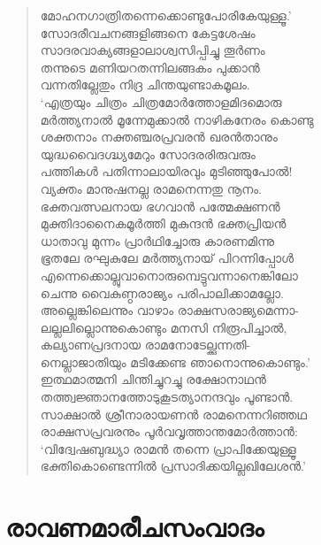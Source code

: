 \begin{verse}
മോഹനഗാത്രിതന്നെക്കൊണ്ടുപോരികേയുള്ളൂ.’\\
സോദരീവചനങ്ങളിങ്ങനെ കേട്ടശേഷം\\
സാദരവാക്യങ്ങളാലാശ്വസിപ്പിച്ചു തൂര്‍ണം\\
തന്നുടെ മണിയറതന്നിലങ്ങകം പുക്കാന്‍\\
വന്നതില്ലേതും നിദ്ര ചിന്തയുണ്ടാകമൂലം.\\
‘എത്രയും ചിത്രം ചിത്രമോര്‍ത്തോളമിദമൊരു\\
മര്‍ത്ത്യനാല്‍ മൂന്നേമുക്കാല്‍ നാഴികനേരം കൊണ്ടു\\
ശക്തനാം നക്തഞ്ചരപ്രവരന്‍ ഖരന്‍താനും\\
യുദ്ധവൈദഗ്ദ്ധ്യമേറും സോദരരിരുവരും\\
പത്തികള്‍ പതിന്നാലായിരവും മുടിഞ്ഞുപോല്‍!\\
വ്യക്തം മാനുഷനല്ല രാമനെന്നതു നൂനം.\\
ഭക്തവത്സലനായ ഭഗവാന്‍ പത്മേക്ഷണന്‍\\
മുക്തിദാനൈകമൂര്‍ത്തി മുകുന്ദന്‍ ഭക്തപ്രിയന്‍\\
ധാതാവു മുന്നം പ്രാര്‍ഥിച്ചോരു കാരണമിന്നു\\
ഭൂതലേ രഘുകുലേ മര്‍ത്ത്യനായ് പിറന്നിപ്പോള്‍\\
എന്നെക്കൊല്ലുവാനൊരുമ്പെട്ടുവന്നാനെങ്കിലോ\\
ചെന്നു വൈകുണ്ഠരാജ്യം പരിപാലിക്കാമല്ലോ.\\
അല്ലെങ്കിലെന്നും വാഴാം രാക്ഷസരാജ്യമെന്നാ-\\
ലല്ലലില്ലൊന്നുകൊണ്ടും മനസി നിരൂപിച്ചാല്‍,\\
കല്യാണപ്രദനായ രാമനോടേല്ക്കുന്നതി-\\
നെല്ലാജാതിയും മടിക്കേണ്ട ഞാനൊന്നുകൊണ്ടും.’\\
ഇത്ഥമാത്മനി ചിന്തിച്ചുറച്ചു രക്ഷോനാഥന്‍\\
തത്ത്വജ്ഞാനത്തോടുകൂടത്യാനന്ദവും പൂണ്ടാന്‍.\\
സാക്ഷാല്‍ ശ്രീനാരായണന്‍ രാമനെന്നറിഞ്ഞഥ\\
രാക്ഷസപ്രവരനും പൂര്‍വവൃത്താന്തമോര്‍ത്താന്‍:\\
‘വിദ്വേഷബുദ്ധ്യാ രാമന്‍ തന്നെ പ്രാപിക്കേയുള്ളൂ\\
ഭക്തികൊണ്ടെന്നില്‍ പ്രസാദിക്കയില്ലഖിലേശന്‍.’
\end{verse}

\section{രാവണമാരീചസംവാദം}

